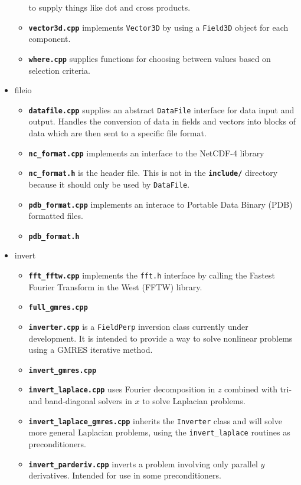\documentclass[12pt]{article}
\newcommand{\code}[1]{\texttt{#1}}
\newcommand{\file}[1]{\texttt{\bf #1}}
\begin{document}
\begin{itemize}
\begin{itemize}
    to supply things like dot and cross products.
  \item \file{vector3d.cpp} implements \code{Vector3D} by using a
    \code{Field3D} object for each component.
  \item \file{where.cpp} supplies functions for choosing between values
    based on selection criteria.
  \end{itemize}
\item fileio
  \begin{itemize}
  \item \file{datafile.cpp} supplies an abstract \code{DataFile} interface
    for data input and output. Handles the conversion of data in fields
    and vectors into blocks of data which are then sent to a specific file
    format.
  \item \file{nc\_format.cpp} implements an interface to the NetCDF-4 library
  \item \file{nc\_format.h} is the header file. This is not in the
    \file{include/} directory because it should only be used by \code{DataFile}.
  \item \file{pdb\_format.cpp} implements an interace to Portable Data
    Binary (PDB) formatted files.
  \item \file{pdb\_format.h}
  \end{itemize}
\item invert
  \begin{itemize}
  \item \file{fft\_fftw.cpp} implements the \code{fft.h} interface by calling
    the Fastest Fourier Transform in the West (FFTW) library.
  \item \file{full\_gmres.cpp}
  \item \file{inverter.cpp} is a \code{FieldPerp} inversion class currently
    under development. It is intended to provide a way to solve nonlinear
    problems using a GMRES iterative method.
  \item \file{invert\_gmres.cpp}
  \item \file{invert\_laplace.cpp} uses Fourier decomposition in $z$ combined
    with tri- and band-diagonal solvers in $x$ to solve Laplacian problems.
  \item \file{invert\_laplace\_gmres.cpp} inherits the \code{Inverter} class
    and will solve more general Laplacian problems, using the
    \code{invert\_laplace} routines as preconditioners.
  \item \file{invert\_parderiv.cpp} inverts a problem involving only parallel
    $y$ derivatives. Intended for use in some preconditioners.

\end{itemize}
\end{itemize}
\end{document}
